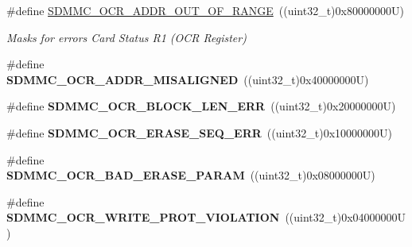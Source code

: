 \begin{DoxyCompactItemize}
\mbox{\label{group___s_d_m_m_c___l_l___exported___constants_gacfd2eb448541e2c49eb3fa0fb333dfe0}} 
\#define \mbox{\hyperlink{group___s_d_m_m_c___l_l___exported___constants_gacfd2eb448541e2c49eb3fa0fb333dfe0}{S\+D\+M\+M\+C\+\_\+\+O\+C\+R\+\_\+\+A\+D\+D\+R\+\_\+\+O\+U\+T\+\_\+\+O\+F\+\_\+\+R\+A\+N\+GE}}~((uint32\+\_\+t)0x80000000\+U)
\begin{DoxyCompactList}\small\item\em Masks for errors Card Status R1 (O\+CR Register) \end{DoxyCompactList}\item 
\mbox{\label{group___s_d_m_m_c___l_l___exported___constants_ga8c7761fa5995960006000bbbcf40a5ad}} 
\#define {\bfseries S\+D\+M\+M\+C\+\_\+\+O\+C\+R\+\_\+\+A\+D\+D\+R\+\_\+\+M\+I\+S\+A\+L\+I\+G\+N\+ED}~((uint32\+\_\+t)0x40000000\+U)
\item 
\mbox{\label{group___s_d_m_m_c___l_l___exported___constants_ga21f3070ab9346fe21f220ab3deaebd02}} 
\#define {\bfseries S\+D\+M\+M\+C\+\_\+\+O\+C\+R\+\_\+\+B\+L\+O\+C\+K\+\_\+\+L\+E\+N\+\_\+\+E\+RR}~((uint32\+\_\+t)0x20000000\+U)
\item 
\mbox{\label{group___s_d_m_m_c___l_l___exported___constants_ga7252d59d806b4eaea27729ce3eadb18a}} 
\#define {\bfseries S\+D\+M\+M\+C\+\_\+\+O\+C\+R\+\_\+\+E\+R\+A\+S\+E\+\_\+\+S\+E\+Q\+\_\+\+E\+RR}~((uint32\+\_\+t)0x10000000\+U)
\item 
\mbox{\label{group___s_d_m_m_c___l_l___exported___constants_ga66c2b5cc672547bdaddcdc3a8817f260}} 
\#define {\bfseries S\+D\+M\+M\+C\+\_\+\+O\+C\+R\+\_\+\+B\+A\+D\+\_\+\+E\+R\+A\+S\+E\+\_\+\+P\+A\+R\+AM}~((uint32\+\_\+t)0x08000000\+U)
\item 
\mbox{\label{group___s_d_m_m_c___l_l___exported___constants_gaa581c5ba5c20ec8e34ee65a77d56044e}} 
\#define {\bfseries S\+D\+M\+M\+C\+\_\+\+O\+C\+R\+\_\+\+W\+R\+I\+T\+E\+\_\+\+P\+R\+O\+T\+\_\+\+V\+I\+O\+L\+A\+T\+I\+ON}~((uint32\+\_\+t)0x04000000\+U)
\item 
\mbox{\label{group___s_d_m_m_c___l_l___exported___constants_gad3db5c8fb618e80198601b49ef1d82a1}} 

\end{DoxyCompactItemize}
